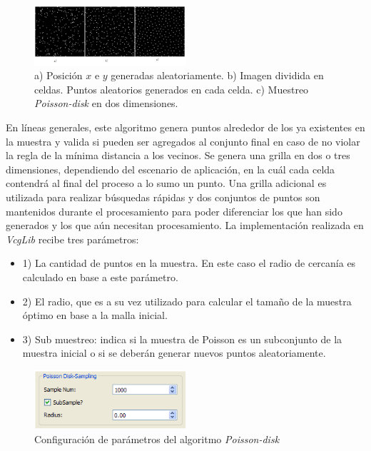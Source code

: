 \begin{figure}[H]
  \centering
    \includegraphics[width=0.5\textwidth]{./Cap6_reconstruccion/malla-poisson.png}
  \caption{a) Posición $x$ e $y$ generadas aleatoriamente. b) Imagen dividida en celdas. Puntos aleatorios generados en cada celda. c) Muestreo \emph{Poisson-disk} en dos dimensiones.}
  \label{fig:Mesh-Poisson}
\end{figure}

En líneas generales, este algoritmo genera puntos alrededor de los ya existentes en la muestra y valida si pueden ser agregados al conjunto final en caso de no violar la regla de la mínima distancia a los vecinos. Se genera una grilla en dos o tres dimensiones, dependiendo del escenario de aplicación, en la cuál cada celda contendrá al final del proceso a lo sumo un punto. Una grilla adicional es utilizada para realizar búsquedas rápidas y dos conjuntos de puntos son mantenidos durante el procesamiento para poder diferenciar los que han sido generados y los que aún necesitan procesamiento.
La implementación realizada en \emph{VcgLib} recibe tres parámetros:
\begin{itemize}
	\item 1) La cantidad de puntos en la muestra. En este caso el radio de cercanía es calculado en base a este parámetro.
	\item 2) El radio, que es a su vez utilizado para calcular el tamaño de la muestra óptimo en base a la malla inicial.
	\item 3) Sub muestreo: indica si la muestra de Poisson es un subconjunto de la muestra inicial o si se deberán generar nuevos puntos aleatoriamente.
\end{itemize}

\begin{figure}[H]
  \centering
    \includegraphics[width=0.5\textwidth]{./Cap6_reconstruccion/malla-poissongui.png}
  \caption{Configuración de parámetros del algoritmo \emph{Poisson-disk}}
  \label{fig:Mesh-PoissonGui}
\end{figure}

